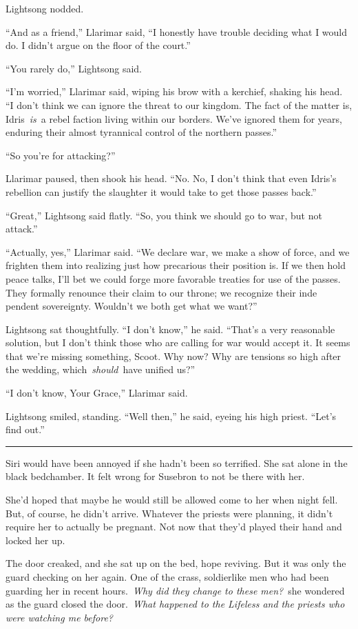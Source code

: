 Lightsong nodded.

“And as a friend,” Llarimar said, “I honestly have trouble deciding what I would do. I didn’t argue on the floor of the court.”

“You rarely do,” Lightsong said.

“I’m worried,” Llarimar said, wiping his brow with a kerchief, shaking his head. “I don’t think we can ignore the threat to our kingdom. The fact of the matter is, Idris~\textit{is}~a rebel faction living within our borders. We’ve ignored them for years, enduring their almost tyrannical control of the northern passes.”

“So you’re for attacking?”

Llarimar paused, then shook his head. “No. No, I don’t think that even Idris’s rebellion can justify the slaughter it would take to get those passes back.”

“Great,” Lightsong said flatly. “So, you think we should go to war, but not attack.”

“Actually, yes,” Llarimar said. “We declare war, we make a show of force, and we frighten them into realizing just how precarious their position is. If we then hold peace talks, I’ll bet we could forge more favorable treaties for use of the passes. They formally renounce their claim to our throne; we recognize their inde pendent sovereignty. Wouldn’t we both get what we want?”

Lightsong sat thoughtfully. “I don’t know,” he said. “That’s a very reasonable solution, but I don’t think those who are calling for war would accept it. It seems that we’re missing something, Scoot. Why now? Why are tensions so high after the wedding, which~\textit{should}~have unified us?”

“I don’t know, Your Grace,” Llarimar said.

Lightsong smiled, standing. “Well then,” he said, eyeing his high priest. “Let’s find out.”

\bigskip \hrule \bigskip

Siri would have been annoyed if she hadn’t been so terrified. She sat alone in the black bedchamber. It felt wrong for Susebron to not be there with her.

She’d hoped that maybe he would still be allowed come to her when night fell. But, of course, he didn’t arrive. Whatever the priests were planning, it didn’t require her to actually be pregnant. Not now that they’d played their hand and locked her up.

The door creaked, and she sat up on the bed, hope reviving. But it was only the guard checking on her again. One of the crass, soldierlike men who had been guarding her in recent hours.~\textit{Why did they change to these men?}~she wondered as the guard closed the door.~\textit{What happened to the Lifeless and the priests who were watching me before?}

